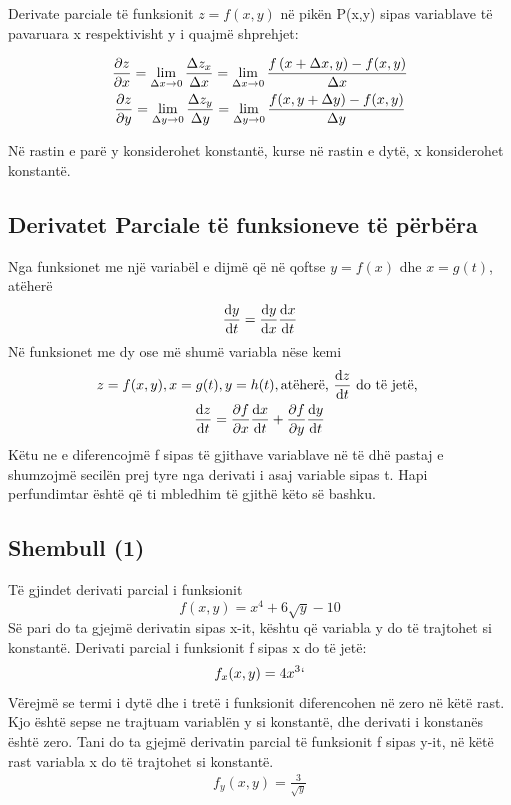 \documentclass[a4paper]{article}
\begin{document}
Derivate parciale të funksionit $z = f(x,y)$ në pikën P(x,y) sipas variablave të pavaruara x respektivisht y i quajmë shprehjet:

\begin{gather}
	\pdv{z}{x} = \lim_{\Delta x\to 0}\frac{\Delta z_x}{\Delta x} = \lim_{\Delta x \to 0}\frac{f\left( x + \Delta x,y \right) - f(x,y) }{\Delta x}\\
	\pdv{z}{y} = \lim_{\Delta y\to 0}\frac{\Delta z_y}{\Delta y} = \lim_{\Delta y \to  0}\frac{f(x,y + \Delta y) - f(x,y)}{\Delta y}
\end{gather}

Në rastin e parë y konsiderohet konstantë, kurse në rastin e dytë, x konsiderohet konstantë.

\subsection{Derivatet Parciale të funksioneve të përbëra}
Nga funksionet me një variabël e dijmë që në qoftse $y=f(x)$ dhe $x=g(t)$, atëherë
\begin{gather*}
	\dv{y}{t} = \dv{y}{x} \dv{x}{t}
\end{gather*}
Në funksionet me dy ose më shumë variabla nëse kemi
\begin{gather*}
	z = f(x,y), x=g(t), y=h(t), \text{atëherë, }\dv{z}{t} \text{ do të jetë, }\\
	\dv{z}{t} = \pdv{f}{x}\dv{x}{t} + \pdv{f}{y}\dv{y}{t}
\end{gather*}
Këtu ne e diferencojmë f sipas të gjithave variablave në të dhë pastaj e shumzojmë secilën prej tyre nga derivati i asaj variable sipas t. Hapi perfundimtar është që ti mbledhim të gjithë këto së bashku.
\subsection{Shembull (1)}
Të gjindet derivati parcial i funksionit
\begin{equation}
	\label{label1}
	f(x,y)=x^4+6\sqrt{y}-10
\end{equation}
Së pari do ta gjejmë derivatin sipas x-it, kështu që variabla y do të trajtohet si konstantë. Derivati parcial i funksionit f sipas x do të jetë:
\begin{align*}
	f_x(x,y) = 4x^3`
\end{align*}
Vërejmë se termi i dytë dhe i tretë i funksionit diferencohen në zero në këtë rast. Kjo është sepse ne trajtuam variablën y si konstantë, dhe derivati i konstanës është zero.
Tani do ta gjejmë derivatin parcial të funksionit f sipas y-it, në këtë rast variabla x do të trajtohet si konstantë.
\begin{align*}
	f_y(x,y) = \frac{3}{\sqrt{y}}
\end{align*}
\end{document}
